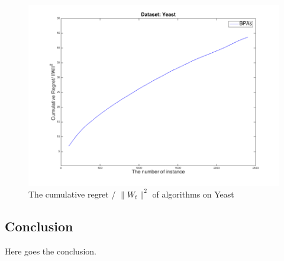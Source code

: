 \begin{figure}[h]
\vspace{.2in}
\centerline{
\includegraphics[scale = 0.6]{fig05/ml/Regret_Norm_Yeast.png}}
\caption{The cumulative regret / $\parallel{W_t}\parallel^2$ of algorithms on Yeast}
\label{pig:RegretY}
\end{figure}

\subsection{Conclusion}
\label{subsec:BPASC}
Here goes the conclusion.